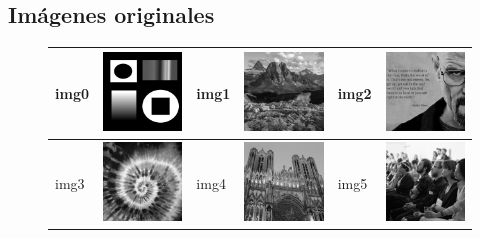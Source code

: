 \documentclass{article}
\begin{document}
\subsection{Imágenes originales}

\begin{figure}[!htp]
\begin{center}
\begin{tabular}[t]{|ll|ll|ll|}
\hline
img0 & \includegraphics[width=3cm]{../imgs/input/imgs_gray/img00.png} &
img1 & \includegraphics[width=3cm]{../imgs/input/imgs_gray/img01.png} &
img2 & \includegraphics[width=3cm]{../imgs/input/imgs_gray/img02.png} \\
\hline
img3 & \includegraphics[width=3cm]{../imgs/input/imgs_gray/img03.png} &
img4 & \includegraphics[width=3cm]{../imgs/input/imgs_gray/img04.png} &
img5 & \includegraphics[width=3cm]{../imgs/input/imgs_gray/img05.png} \\

\end{tabular}
\end{center}
\end{figure}
\end{document}
